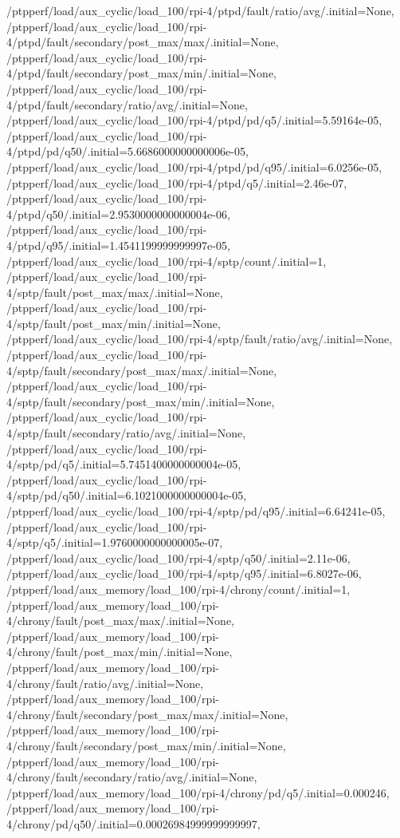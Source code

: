 {    /ptpperf/load/aux_cyclic/load_100/rpi-4/ptpd/fault/ratio/avg/.initial=None,
    /ptpperf/load/aux_cyclic/load_100/rpi-4/ptpd/fault/secondary/post_max/max/.initial=None,
    /ptpperf/load/aux_cyclic/load_100/rpi-4/ptpd/fault/secondary/post_max/min/.initial=None,
    /ptpperf/load/aux_cyclic/load_100/rpi-4/ptpd/fault/secondary/ratio/avg/.initial=None,
    /ptpperf/load/aux_cyclic/load_100/rpi-4/ptpd/pd/q5/.initial=5.59164e-05,
    /ptpperf/load/aux_cyclic/load_100/rpi-4/ptpd/pd/q50/.initial=5.6686000000000006e-05,
    /ptpperf/load/aux_cyclic/load_100/rpi-4/ptpd/pd/q95/.initial=6.0256e-05,
    /ptpperf/load/aux_cyclic/load_100/rpi-4/ptpd/q5/.initial=2.46e-07,
    /ptpperf/load/aux_cyclic/load_100/rpi-4/ptpd/q50/.initial=2.9530000000000004e-06,
    /ptpperf/load/aux_cyclic/load_100/rpi-4/ptpd/q95/.initial=1.4541199999999997e-05,
    /ptpperf/load/aux_cyclic/load_100/rpi-4/sptp/count/.initial=1,
    /ptpperf/load/aux_cyclic/load_100/rpi-4/sptp/fault/post_max/max/.initial=None,
    /ptpperf/load/aux_cyclic/load_100/rpi-4/sptp/fault/post_max/min/.initial=None,
    /ptpperf/load/aux_cyclic/load_100/rpi-4/sptp/fault/ratio/avg/.initial=None,
    /ptpperf/load/aux_cyclic/load_100/rpi-4/sptp/fault/secondary/post_max/max/.initial=None,
    /ptpperf/load/aux_cyclic/load_100/rpi-4/sptp/fault/secondary/post_max/min/.initial=None,
    /ptpperf/load/aux_cyclic/load_100/rpi-4/sptp/fault/secondary/ratio/avg/.initial=None,
    /ptpperf/load/aux_cyclic/load_100/rpi-4/sptp/pd/q5/.initial=5.7451400000000004e-05,
    /ptpperf/load/aux_cyclic/load_100/rpi-4/sptp/pd/q50/.initial=6.1021000000000004e-05,
    /ptpperf/load/aux_cyclic/load_100/rpi-4/sptp/pd/q95/.initial=6.64241e-05,
    /ptpperf/load/aux_cyclic/load_100/rpi-4/sptp/q5/.initial=1.9760000000000005e-07,
    /ptpperf/load/aux_cyclic/load_100/rpi-4/sptp/q50/.initial=2.11e-06,
    /ptpperf/load/aux_cyclic/load_100/rpi-4/sptp/q95/.initial=6.8027e-06,
    /ptpperf/load/aux_memory/load_100/rpi-4/chrony/count/.initial=1,
    /ptpperf/load/aux_memory/load_100/rpi-4/chrony/fault/post_max/max/.initial=None,
    /ptpperf/load/aux_memory/load_100/rpi-4/chrony/fault/post_max/min/.initial=None,
    /ptpperf/load/aux_memory/load_100/rpi-4/chrony/fault/ratio/avg/.initial=None,
    /ptpperf/load/aux_memory/load_100/rpi-4/chrony/fault/secondary/post_max/max/.initial=None,
    /ptpperf/load/aux_memory/load_100/rpi-4/chrony/fault/secondary/post_max/min/.initial=None,
    /ptpperf/load/aux_memory/load_100/rpi-4/chrony/fault/secondary/ratio/avg/.initial=None,
    /ptpperf/load/aux_memory/load_100/rpi-4/chrony/pd/q5/.initial=0.000246,
    /ptpperf/load/aux_memory/load_100/rpi-4/chrony/pd/q50/.initial=0.00026984999999999997,
}
